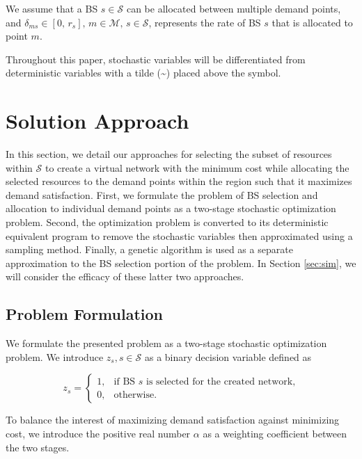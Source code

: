 \documentclass[conference]{IEEEtran}
\begin{document}
We assume that a BS $s \in \mathcal{S}$ can be allocated between multiple demand points, and $\delta_{ms} \in [0,\, r_s],\, m \in \mathcal{M},\, s \in \mathcal{S}$, represents the rate of BS $s$ that is allocated to point $m$.

Throughout this paper, stochastic variables will be differentiated from deterministic variables with a tilde (\textasciitilde) placed above the symbol.

\section{Solution Approach} \label{sec:approach}
In this section, we detail our approaches for selecting the subset of resources within $\mathcal{S}$ to create a virtual network with the minimum cost while allocating the selected resources to the demand points within the region such that it maximizes demand satisfaction.  First, we formulate the problem of BS selection and allocation to individual demand points as a two-stage stochastic optimization problem.  Second, the optimization problem is converted to its deterministic equivalent program to remove the stochastic variables then approximated using a sampling method.  Finally, a genetic algorithm is used as a separate approximation to the BS selection portion of the problem.  In Section \ref{sec:sim}, we will consider the efficacy of these latter two approaches.

\subsection{Problem Formulation} \label{subsec:stoch}
We formulate the presented problem as a two-stage stochastic optimization problem.  We introduce $z_s, s \in \mathcal{S}$ as a binary decision variable defined as

\[ z_s =
	\begin{cases}
		1,& \text{if BS $s$ is selected for the created network,}\\
		0,& \text{otherwise.}
	\end{cases}
\]

To balance the interest of maximizing demand satisfaction against minimizing cost, we introduce the positive real number $\alpha$ as a weighting coefficient between the two stages.
\end{document}
